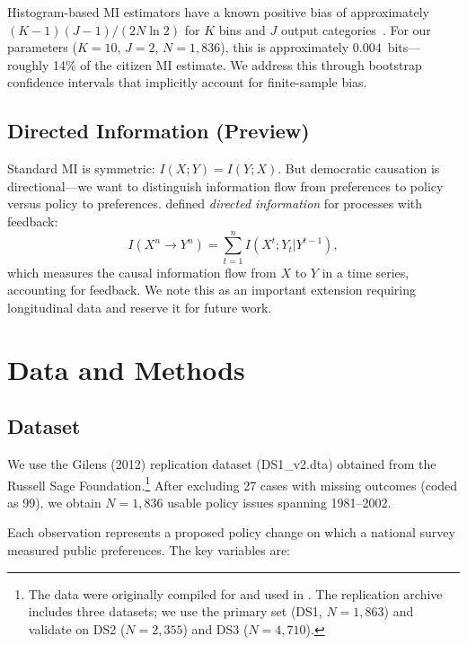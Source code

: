 \documentclass[twocolumn,10pt]{article}
\begin{document}
Histogram-based MI estimators have a known positive bias of approximately $(K-1)(J-1)/(2N\ln 2)$ for $K$ bins and $J$ output categories~\citep{miller1955}.  For our parameters ($K=10$, $J=2$, $N=1{,}836$), this is approximately $0.004$~bits---roughly 14\% of the citizen MI estimate.  We address this through bootstrap confidence intervals that implicitly account for finite-sample bias.

\subsection{Directed Information (Preview)}

Standard MI is symmetric: $I(X;Y) = I(Y;X)$.  But democratic causation is directional---we want to distinguish information flow from preferences to policy versus policy to preferences.  \citet{massey1990} defined \emph{directed information} for processes with feedback:
\begin{equation}
I(X^n \to Y^n) = \sum_{t=1}^{n} I(X^t; Y_t | Y^{t-1}),
\label{eq:directed}
\end{equation}
which measures the causal information flow from $X$ to $Y$ in a time series, accounting for feedback.  We note this as an important extension requiring longitudinal data and reserve it for future work.

\section{Data and Methods}
\label{sec:data}

\subsection{Dataset}

We use the Gilens (2012) replication dataset (DS1\_v2.dta) obtained from the Russell Sage Foundation.\footnote{The data were originally compiled for \citet{gilens2012} and used in \citet{gilens2014testing}.  The replication archive includes three datasets; we use the primary set (DS1, $N = 1{,}863$) and validate on DS2 ($N = 2{,}355$) and DS3 ($N = 4{,}710$).}  After excluding 27 cases with missing outcomes (coded as 99), we obtain $N = 1{,}836$ usable policy issues spanning 1981--2002.

Each observation represents a proposed policy change on which a national survey measured public preferences.  The key variables are:
\end{document}
